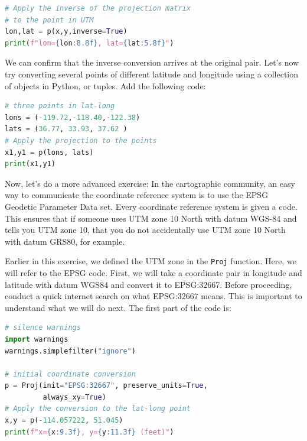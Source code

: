 \documentclass[a4paper , 12pt]{book}
\newcommand{\code}[1]{\colorbox{light-gray}{\texttt{#1}}}
\begin{document}
\begin{center}
\begin{lstlisting}[language=Python, frame=single]
# Apply the inverse of the projection matrix
# to the point in UTM
lon,lat = p(x,y,inverse=True)
print(f"lon={lon:8.8f}, lat={lat:5.8f}")
\end{lstlisting}
\end{center}

We can confirm that the inverse conversion arrives at the original pair. Let's now try converting several points of different latitude and longitude using a collection of objects in Python, or tuples. Add the following code:

\begin{center}
\begin{lstlisting}[language=Python, frame=single]
# three points in lat-long
lons = (-119.72,-118.40,-122.38)
lats = (36.77, 33.93, 37.62 )
# Apply the projection to the points
x1,y1 = p(lons, lats)
print(x1,y1)
\end{lstlisting}
\end{center}

Now, let's do a more advanced exercise: In the cartographic community, an easy way to communicate the coordinate reference system is to use the EPSG Geodetic Parameter Data set. Every coordinate reference system is given a code. This ensures that if someone uses UTM zone 10 North with datum WGS-84 and tells you UTM zone 10, that you do not accidentally use UTM zone 10 North with datum GRS80, for example.

Earlier in this exercise, we defined the UTM zone in the \code{Proj} function. Here, we will refer to the EPSG code. First, we will take a coordinate pair in longitude and latitude with datum WGS84 and convert it to EPSG:32667. Before proceeding, conduct a quick internet search on what EPSG:32667 means. This is important to understand what we will do next. The first part of the code is:

\begin{center}
\begin{lstlisting}[language=Python, frame=single]
# silence warnings
import warnings 
warnings.simplefilter("ignore")

# initial coordinate conversion
p = Proj(init="EPSG:32667", preserve_units=True, 
         always_xy=True)
# Apply the conversion to the lat-long point
x,y = p(-114.057222, 51.045)
print(f"x={x:9.3f}, y={y:11.3f} (feet)")
\end{lstlisting}
\end{center}
\end{document}
